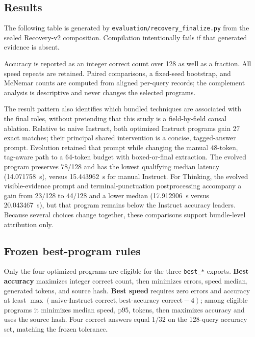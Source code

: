 \documentclass{article}
\begin{document}
\subsection{Results}
The following table is generated by
\texttt{evaluation/recovery\_finalize.py} from the sealed Recovery-v2 composition.
Compilation intentionally fails if that generated evidence is absent.



Accuracy is reported as an integer correct count over 128 as well as a fraction.
All speed repeats are retained. Paired comparisons, a fixed-seed bootstrap, and
McNemar counts are computed from aligned per-query records; the complement analysis
is descriptive and never changes the selected programs.

The result pattern also identifies which bundled techniques are associated with
the final roles, without pretending that this study is a field-by-field causal
ablation. Relative to naive Instruct, both optimized Instruct programs gain 27
exact matches; their principal shared intervention is a concise, tagged-answer
prompt. Evolution retained that prompt while changing the manual 48-token,
tag-aware path to a 64-token budget with boxed-or-final extraction. The evolved
program preserves 78/128 and has the lowest qualifying median latency
(14.071758~s), versus 15.443962~s for manual Instruct. For Thinking, the evolved
visible-evidence prompt and terminal-punctuation postprocessing accompany a gain
from 23/128 to 44/128 and a lower median (17.912906~s versus 20.043467~s), but that
program remains below the Instruct accuracy leaders. Because several choices
change together, these comparisons support bundle-level attribution only.

\subsection{Frozen best-program rules}
Only the four optimized programs are eligible for the three \texttt{best\_*}
exports. \textbf{Best accuracy} maximizes integer correct count, then minimizes
errors, speed median, generated tokens, and source hash. \textbf{Best speed}
requires zero errors and accuracy at least
$\max(\text{naive-Instruct correct},\text{best-accuracy correct}-4)$; among eligible
programs it minimizes median speed, p95, tokens, then maximizes accuracy and uses
the source hash. Four correct answers equal $1/32$ on the 128-query accuracy set,
matching the frozen tolerance.
\end{document}
